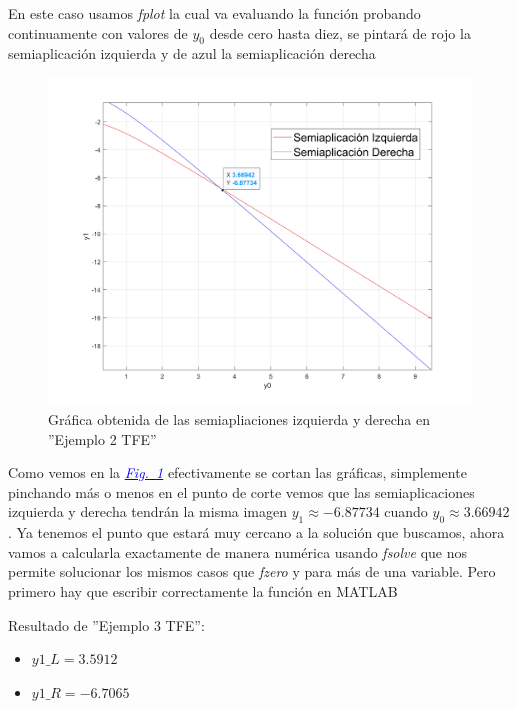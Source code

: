 \documentclass[12pt,a4paper]{report} %
\newcommand{\fref}[1]{\hyperref[#1]{\textcolor{blue}{\textit{Fig.~\ref*{#1}}}}}
\begin{document}
	\vspace{1cm}En este caso usamos \textit{fplot} la cual va evaluando la función probando continuamente con valores de $y_0$ desde cero hasta diez, se pintará de rojo la semiaplicación izquierda y de azul la semiaplicación derecha 
	\newpage
	
	\begin{figure}[h]
		\centering
		\includegraphics[width=1\textwidth]{ejem2_2.jpg}
		\caption{Gráfica obtenida de las semiapliaciones izquierda y derecha en ''Ejemplo 2 TFE''}
		\label{fig:ejem2_2}
	\end{figure}\smallskip
	
	Como vemos en la \fref{fig:ejem2_2} efectivamente se cortan las gráficas, simplemente pinchando más o menos en el punto de corte vemos que las semiaplicaciones izquierda y derecha tendrán la misma imagen $y_1\approx-6.87734$ cuando $y_0\approx3.66942$.
	\newpage
	Ya tenemos el punto que estará muy cercano a la solución que buscamos, ahora vamos a calcularla exactamente de manera numérica usando \textit{fsolve} que nos permite solucionar los mismos casos que \textit{fzero} y para más de una variable. Pero primero hay que escribir correctamente la función en MATLAB
	
		
	\vspace{1cm}
	
	\vspace{0.5cm}\noindent Resultado de ''Ejemplo 3 TFE'':
	\begin{itemize}
		\item $y1\_L=3.5912$
		\item $y1\_R=-6.7065$
	\end{itemize}
	
\end{document}
